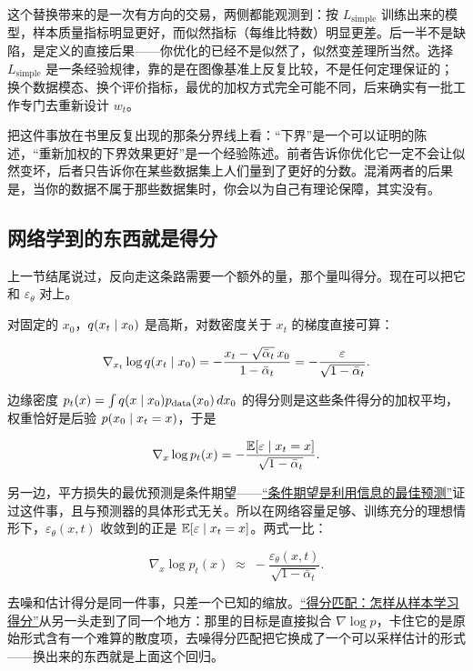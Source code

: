 这个替换带来的是一次有方向的交易，两侧都能观测到：按 \(L_{\mathrm{simple}}\) 训练出来的模型，样本质量指标明显更好，而似然指标（每维比特数）明显更差。后一半不是缺陷，是定义的直接后果——你优化的已经不是似然了，似然变差理所当然。选择 \(L_{\mathrm{simple}}\) 是一条经验规律，靠的是在图像基准上反复比较，不是任何定理保证的；换个数据模态、换个评价指标，最优的加权方式完全可能不同，后来确实有一批工作专门去重新设计 \(w_t\)。

\begin{remark}
把这件事放在书里反复出现的那条分界线上看：``下界''是一个可以证明的陈述，``重新加权的下界效果更好''是一个经验陈述。前者告诉你优化它一定不会让似然变坏，后者只告诉你在某些数据集上人们量到了更好的分数。混淆两者的后果是，当你的数据不属于那些数据集时，你会以为自己有理论保障，其实没有。
\end{remark}

\subsection{网络学到的东西就是得分}

上一节结尾说过，反向走这条路需要一个额外的量，那个量叫得分。现在可以把它和 \(\varepsilon_\theta\) 对上。

对固定的 \(x_0\)，\(q(x_t\mid x_0)\) 是高斯，对数密度关于 \(x_t\) 的梯度直接可算：

\[
\nabla_{x_t}\log q(x_t\mid x_0)
= -\frac{x_t-\sqrt{\bar\alpha_t}\,x_0}{1-\bar\alpha_t}
= -\frac{\varepsilon}{\sqrt{1-\bar\alpha_t}} .
\]

边缘密度 \(p_t(x)=\int q(x\mid x_0)p_{\mathrm{data}}(x_0)\,dx_0\) 的得分则是这些条件得分的加权平均，权重恰好是后验 \(p(x_0\mid x_t=x)\)，于是

\[
\nabla_x\log p_t(x) = -\frac{\mathbb{E}[\varepsilon\mid x_t=x]}{\sqrt{1-\bar\alpha_t}} .
\]

另一边，平方损失的最优预测是条件期望——\hyperref[sec:05-Probability/04-Expectation-and-Moments/04]{``条件期望是利用信息的最佳预测''}证过这件事，且与预测器的具体形式无关。所以在网络容量足够、训练充分的理想情形下，\(\varepsilon_\theta(x,t)\) 收敛到的正是 \(\mathbb{E}[\varepsilon\mid x_t=x]\)。两式一比：

\[
\nabla_x\log p_t(x)\;\approx\;-\frac{\varepsilon_\theta(x,t)}{\sqrt{1-\bar\alpha_t}} .
\]

去噪和估计得分是同一件事，只差一个已知的缩放。\hyperref[sec:06-Random-Processes/06-Diffusion-and-SDE/05]{``得分匹配：怎样从样本学习得分''}从另一头走到了同一个地方：那里的目标是直接拟合 \(\nabla\log p\)，卡住它的是原始形式含有一个难算的散度项，去噪得分匹配把它换成了一个可以采样估计的形式——换出来的东西就是上面这个回归。

